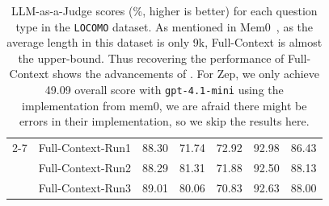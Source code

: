 \begin{table}[h!]
\begin{tabular}{p{0.5cm}l|cccc|c}
\cmidrule{2-7}
& Full-Context-Run1 & 88.30 & 71.74 & 72.92 & 92.98 & 86.43 \\
& Full-Context-Run2 & 88.29 & 81.31 & 71.88 & 92.50 & 88.13 \\
& Full-Context-Run3 & 89.01 & 80.06 & 70.83 & 92.63 & 88.00 \\
\bottomrule
\end{tabular}%
\caption{LLM-as-a-Judge scores (\%, higher is better) for each question type in the \texttt{LOCOMO} dataset. As mentioned in Mem0~\citep{mem0}, as the average length in this dataset is only 9k, Full-Context is almost the upper-bound. Thus recovering the performance of Full-Context shows the advancements of \ours. For Zep, we only achieve 49.09 overall score with \texttt{gpt-4.1-mini} using the implementation from mem0, we are afraid there might be errors in their implementation, so we skip the results here.}
\label{tab:full_locomo}
\end{table}
